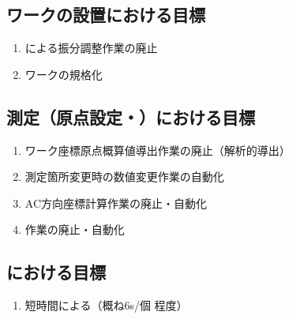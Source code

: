 \clearpage


\subsection{ワークの設置における目標}
\begin{enumerate}
\item \Spacer による振分調整作業の廃止
\item ワーク\FixtureBolt の規格化
\end{enumerate}


\subsection{測定（原点設定・\CenterlineEndFaceDif）における目標}
\begin{enumerate}
\item {}ワーク座標原点概算値導出作業の廃止（解析的導出）
\item 測定箇所変更時の数値変更作業の自動化
\item AC方向\KeywayCenter 座標計算作業の廃止・自動化
\item \CenterlineEndFaceDifMeasurement 作業の廃止・自動化
\end{enumerate}


\subsection{\DimpleMeasurement における目標}
\begin{enumerate}
\item 短時間による\DimpleMeasurement（概ね6s/個 程度）
\end{enumerate}


